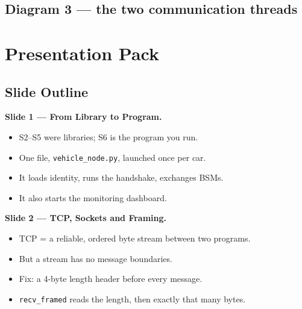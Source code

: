 \documentclass[11pt,a4paper]{report}
\begin{document}
\subsection{Diagram 3 --- the two communication threads}
\begin{center}
\end{center}

\section{Presentation Pack}

\subsection{Slide Outline}

\textbf{Slide 1 --- From Library to Program.}
\begin{itemize}
  \item S2--S5 were libraries; S6 is the program you run.
  \item One file, \texttt{vehicle\_node.py}, launched once per car.
  \item It loads identity, runs the handshake, exchanges BSMs.
  \item It also starts the monitoring dashboard.
\end{itemize}

\textbf{Slide 2 --- TCP, Sockets and Framing.}
\begin{itemize}
  \item TCP = a reliable, ordered byte stream between two programs.
  \item But a stream has no message boundaries.
  \item Fix: a 4-byte length header before every message.
  \item \texttt{recv\_framed} reads the length, then exactly that many bytes.
\end{itemize}
\end{document}
